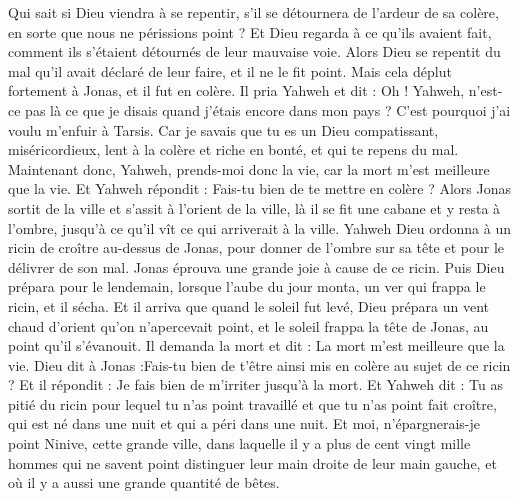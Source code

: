 \begin{multicols}{2}
Qui sait si Dieu viendra à se repentir, s'il se détournera de l'ardeur de sa colère, en sorte que nous ne périssions point ?
Et Dieu regarda à ce qu'ils avaient fait, comment ils s'étaient détournés de leur mauvaise voie. Alors Dieu se repentit du mal qu'il avait déclaré de leur faire, et il ne le fit point.
\VerseOne{}Mais cela déplut fortement à Jonas, et il fut en colère.
Il pria Yahweh et dit : Oh ! Yahweh, n'est-ce pas là ce que je disais quand j'étais encore dans mon pays ? C'est pourquoi j'ai voulu m'enfuir à Tarsis. Car je savais que tu es un Dieu compatissant, miséricordieux, lent à la colère et riche en bonté, et qui te repens du mal.
Maintenant donc, Yahweh, prends-moi donc la vie, car la mort m'est meilleure que la vie.
Et Yahweh répondit : Fais-tu bien de te mettre en colère ?
Alors Jonas sortit de la ville et s'assit à l'orient de la ville, là il se fit une cabane et y resta à l'ombre, jusqu'à ce qu'il vît ce qui arriverait à la ville.
Yahweh Dieu ordonna à un ricin de croître au-dessus de Jonas, pour donner de l'ombre sur sa tête et pour le délivrer de son mal. Jonas éprouva une grande joie à cause de ce ricin.
Puis Dieu prépara pour le lendemain, lorsque l'aube du jour monta, un ver qui frappa le ricin, et il sécha.
Et il arriva que quand le soleil fut levé, Dieu prépara un vent chaud d'orient qu'on n'apercevait point, et le soleil frappa la tête de Jonas, au point qu'il s'évanouit. Il demanda la mort et dit : La mort m'est meilleure que la vie.
Dieu dit à Jonas :Fais-tu bien de t'être ainsi mis en colère au sujet de ce ricin ? Et il répondit : Je fais bien de m'irriter jusqu'à la mort.
Et Yahweh dit : Tu as pitié du ricin pour lequel tu n'as point travaillé et que tu n'as point fait croître, qui est né dans une nuit et qui a péri dans une nuit.
Et moi, n'épargnerais-je point Ninive, cette grande ville, dans laquelle il y a plus de cent vingt mille hommes qui ne savent point distinguer leur main droite de leur main gauche, et où il y a aussi une grande quantité de bêtes.
\PPE{}
\end{multicols}
